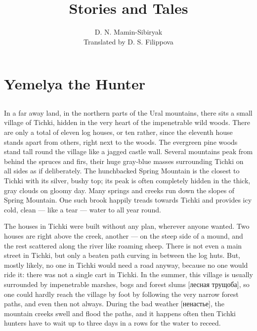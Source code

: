\documentclass[b5paper,12pt,openany]{book}
\begin{document}
\title{Stories and Tales}
\author{D. N. Mamin-Sibiryak \\ Translated by D. S. Filippova}

\maketitle

\chapter{Yemelya the Hunter}

\section{}

In a far away land, in the northern parts of the Ural mountains, there sits a small village of Tichki, hidden in the very heart of the impenetrable wild woods. There are only a total of eleven log houses, or ten rather, since the eleventh house stands apart from others, right next to the woods.
The evergreen pine woods stand tall round the village like a jagged castle wall.
Several mountains peak from behind the spruces and firs, their huge gray-blue masses  surrounding Tichki on all sides as if deliberately. The hunchbacked Spring Mountain is the closest to Tichki with its silver, bushy top; its peak is often completely hidden in the thick, gray clouds on gloomy day. Many springs and creeks run down the slopes of Spring Mountain. One such brook happily treads towards Tichki and provides icy cold, clean --- like a tear --- water to all year round.

The houses in Tichki were built without any plan, wherever anyone wanted. Two houses are right above the creek, another --- on the steep side of a mound, and the rest scattered along the river like roaming sheep. There is not even a main street in Tichki, but only a beaten path curving in between the log huts. But, mostly likely, no one in Tichki would need a road anyway, because no one would ride it: there was not a single cart in Tichki. In the summer, this village is usually surrounded by impenetrable marshes, bogs and forest slums [лесная трущоба], so one could hardly reach the village by foot by following the very narrow forest paths, and even then not always. During the bad weather [ненастье], the mountain creeks swell and flood the paths, and it happens often then Tichki hunters have to wait up to three days in a rows for the water to receed.
\end{document}
